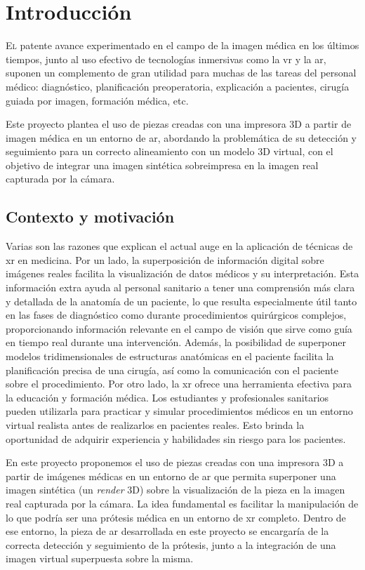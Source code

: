 \chapter{Introducción}
\label{chap:introducion}

\lettrine{E}{l} patente avance experimentado en el campo de la imagen médica en los últimos tiempos, junto al uso efectivo de tecnologías inmersivas como la \gls{vr} y la \gls{ar}, suponen un complemento de gran utilidad para muchas de las tareas del personal médico: diagnóstico, planificación preoperatoria, explicación a pacientes, cirugía guiada por imagen, formación médica, etc.

Este proyecto plantea el uso de piezas creadas con una impresora 3D a partir de imagen médica en un entorno de \gls{ar}, abordando la problemática de su detección y seguimiento para un correcto alineamiento con un modelo 3D virtual, con el objetivo de integrar una imagen sintética sobreimpresa en la imagen real capturada por la cámara.


\section{Contexto y motivación}

Varias son las razones que explican el actual auge en la aplicación de técnicas de \gls{xr} en medicina. Por un lado, la superposición de información digital sobre imágenes reales facilita la visualización de datos médicos y su interpretación. Esta información extra ayuda al personal sanitario a tener una comprensión más clara y detallada de la anatomía de un paciente, lo que resulta especialmente útil tanto en las fases de diagnóstico como durante procedimientos quirúrgicos complejos, proporcionando información relevante en el campo de visión que sirve como guía en tiempo real durante una intervención. Además, la posibilidad de superponer modelos tridimensionales de estructuras anatómicas en el paciente facilita la planificación precisa de una cirugía, así como la comunicación con el paciente sobre el procedimiento. Por otro lado, la \gls{xr} ofrece una herramienta efectiva para la educación y formación médica. Los estudiantes y profesionales sanitarios pueden utilizarla para practicar y simular procedimientos médicos en un entorno virtual realista antes de realizarlos en pacientes reales. Esto brinda la oportunidad de adquirir experiencia y habilidades sin riesgo para los pacientes.

En este proyecto proponemos el uso de piezas creadas con una impresora 3D a partir de imágenes médicas en un entorno de \gls{ar} que permita superponer una imagen sintética (un \emph{render} 3D) sobre la visualización de la pieza en la imagen real capturada por la cámara. La idea fundamental es facilitar la manipulación de lo que podría ser una prótesis médica en un entorno de \gls{xr} completo. Dentro de ese entorno, la pieza de \acrshort{ar} desarrollada en este proyecto se encargaría de la correcta detección y seguimiento de la prótesis, junto a la integración de una imagen virtual superpuesta sobre la misma.

